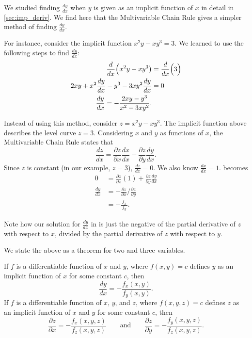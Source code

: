 We studied finding $\frac{dy}{dx}$ when $y$ is given as an implicit function of $x$ in detail in \autoref{sec:imp_deriv}. We find here that the Multivariable Chain Rule gives a simpler method of finding $\frac{dy}{dx}$.

For instance, consider the implicit function $x^2y-xy^3=3.$ We learned to use the following steps to find $\frac{dy}{dx}$:
\begin{align}
\frac{d}{dx}\Big(x^2y-xy^3\big) &= \frac{d}{dx}\Big(3\Big) \notag\\
2xy + x^2\frac{dy}{dx}-y^3-3xy^2\frac{dy}{dx} &= 0\notag \\
\frac{dy}{dx} = -\frac{2xy-y^3}{x^2-3xy^2}.\label{eq:mchain2}
\end{align}

Instead of using this method, consider $z=x^2y-xy^3$. The implicit function above describes the level curve $z=3$. Considering $x$ and $y$ as functions of $x$, the Multivariable Chain Rule states that
\begin{equation}\frac{dz}{dx} = \frac{\partial z}{\partial x}\frac{dx}{dx}+\frac{\partial z}{\partial y}\frac{dy}{dx}.\label{eq:mchain1}\end{equation}
Since $z$ is constant (in our example, $z=3$), $\frac{dz}{dx} = 0$. We also know $\frac{dx}{dx} = 1$.  becomes
\begin{align*}
0 &= \frac{\partial z}{\partial x}(1) + \frac{\partial z}{\partial y}\frac{dy}{dx} %
\\[5pt]
\frac{dy}{dx} &= -\frac{\partial z}{\partial x}\Big/\frac{\partial z}{\partial y}\\[5pt]
			&= -\frac{\,f_x\,}{f_y}.
\end{align*}

Note how our solution for $\frac{dy}{dx}$ in  is just the negative of the partial derivative of $z$ with respect to $x$, divided by the partial derivative of $z$ with respect to $y$.

We state the above as a theorem for two and three variables.

\begin{theorem}\label{thm:implicit_deriv_chain}
If $f$ is a differentiable function of $x$ and $y$, where $f(x,y)=c$ defines $y$ as  an implicit function of $x$ for some constant $c$, then
\[\frac{dy}{dx} = - \frac{f_x(x,y)}{f_y(x,y)}.\]
If $f$ is a differentiable function of $x$, $y$, and $z$, where $f(x,y,z)=c$ defines $z$ as an implicit function of $x$ and $y$ for some constant $c$, then
\[
\frac{\partial z}{\partial x}=-\frac{f_x(x,y,z)}{f_z(x,y,z)}
\qquad\text{and}\qquad
\frac{\partial z}{\partial y}=-\frac{f_y(x,y,z)}{f_z(x,y,z)}.
\]
\end{theorem}


